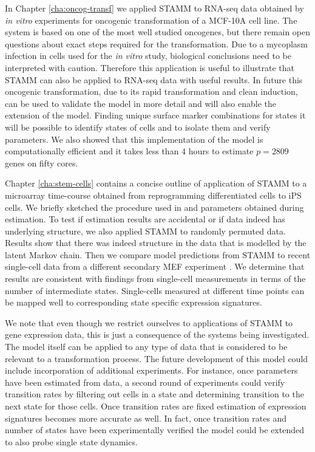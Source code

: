 In Chapter \ref{cha:oncog-transf} we applied STAMM to RNA-seq data obtained by {\it in vitro} experiments for oncogenic transformation of a MCF-10A cell line. The system is based on one of the most well studied oncogenes, but there remain open questions about exact steps required for the transformation. Due to a mycoplasm infection in  cells used for the {\it in vitro} study, biological conclusions need to be interpreted with caution. Therefore this application is useful to illustrate that STAMM can also be applied to RNA-seq data with useful results. In future this oncogenic transformation, due to its rapid transformation and clean induction, can be used to validate the model in more detail and will also enable the extension of the model. Finding unique surface marker combinations for states it will be possible to identify states of cells and to isolate them and verify parameters. We also showed that this implementation of the model is computationally efficient and it takes less than $4$ hours to estimate $p=2809$ genes on fifty cores.

Chapter \ref{cha:stem-cells} contains a concise outline of application of STAMM to a microarray time-course obtained from reprogramming differentiated cells to iPS cells. We briefly sketched the procedure used in \cite{Armond:2013} and parameters obtained during estimation. To test if estimation results are accidental or if data indeed has underlying structure, we also applied STAMM to randomly permuted data. Results show that there was indeed structure in the data that is modelled by the latent Markov chain. Then we compare model predictions from STAMM to recent single-cell data from a different secondary MEF experiment \citep{Buganim:2012hp}. We determine that results are consistent with findings from single-cell measurements in terms of the number of intermediate states. Single-cells measured at different time points can be mapped well to corresponding state specific expression signatures.

We note that even though we restrict ourselves to applications of STAMM to gene expression data, this is just a consequence of the systems being investigated. The model itself can be applied to any type of data that is considered to be relevant to a transformation process. The future development of this model could include incorporation of additional experiments. For instance, once parameters have been estimated from data, a second round of experiments could verify transition rates by filtering out cells in a state and determining transition to the next state for those cells. Once transition rates are fixed estimation of expression signatures becomes more accurate as well. In fact, once transition rates and number of states have been experimentally verified the model could be extended to also probe single state dynamics.

